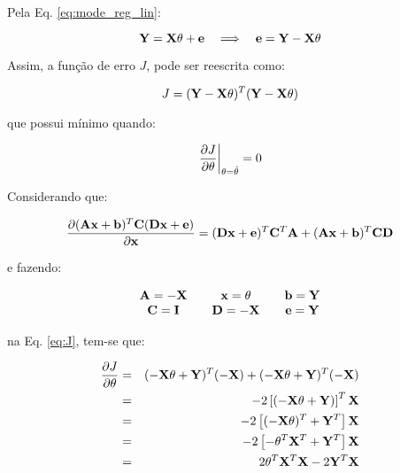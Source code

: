 Pela Eq. \ref{eq:mode_reg_lin}:

\begin{equation}
\mathbf{Y} = \mathbf{X\theta} + \mathbf{e} \quad\Longrightarrow\quad \mathbf{e} = \mathbf{Y} - \mathbf{X\theta}
\end{equation}

Assim, a função de erro $J$, pode ser reescrita como:

\begin{equation}\label{eq:J}
J = (\mathbf{Y} - \mathbf{X\theta})^T(\mathbf{Y} - \mathbf{X\theta})
\end{equation}

\noindent que possui mínimo quando:

\begin{equation*}
\left.\frac{\partial J}{\partial \theta}\right|_{\theta = \hat{\mathbf{\theta}}} = 0
\end{equation*}

Considerando que:

\begin{equation*}
\frac{\partial (\mathbf{Ax} + \mathbf{b})^T\mathbf{C}(\mathbf{Dx} + \mathbf{e})}{\partial \mathbf{x}} =
(\mathbf{Dx} + \mathbf{e})^T\mathbf{C}^T\mathbf{A} + (\mathbf{Ax} + \mathbf{b})^T\mathbf{CD}
\end{equation*}

\noindent e fazendo:

\begin{equation*}
\begin{array}{c@{\qquad}c@{\qquad}c}
\mb{A} = -\mb{X} & \mb{x} = \mb{\theta} & \mb{b} = \mb{Y}\\
\mb{C} = \mb{I}  & \mb{D} = -\mb{X}     & \mb{e} = \mb{Y}
\end{array}
\end{equation*}

\noindent na Eq. \ref{eq:J}, tem-se que:

\begin{eqnarray}
\frac{\partial J}{\partial \mathbf{\theta}} & = & 
(-\mathbf{X\theta}+\mathbf{Y})^T(-\mathbf{X}) + (-\mathbf{X\theta}+\mathbf{Y})^T(-\mathbf{X})\nonumber\\
& = & -2 \left[(-\mathbf{X\theta}+\mathbf{Y})\right]^T\mathbf{X}\nonumber\\
& = & -2 \left[(-\mathbf{X\theta})^T + \mathbf{Y}^T\right]\mathbf{X}\nonumber\\
& = & -2 \left[-\mathbf{\theta}^T\mathbf{X}^T + \mathbf{Y}^T\right]\mathbf{X}\nonumber\\
& = & 2 \mathbf{\theta}^T\mathbf{X}^T\mathbf{X} -2 \mathbf{Y}^T\mathbf{X}\label{eq:deduc}
\end{eqnarray}

